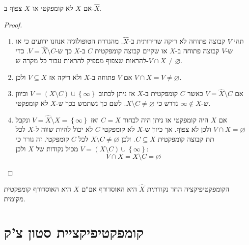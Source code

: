 \documentclass{tstextbook}
\begin{document}
\begin{proposition}
אם \(X\) לא קומפקטי אז \(X\) צפוף ב-\(\hat{X}\).

\end{proposition}
\begin{proof}
  \begin{enumerate}
    \item תהי \(V\) קבוצה פתוחה לא ריקה שרירותית ב-\(\hat{X}\). מהגדרת הטופולוגיה אנחנו ידועים כי או ש-\(V\) קבוצה פתוחה ב-\(X\) או שקיים קבוצה קומפקטית \(C\) ב-\(X\) כך ש-\(V=\hat{X}\setminus C\). כדי להראות שצפוף מספיק להראות עבור כל מקרה ש-\(V\cap X\neq \varnothing\). 


    \item אם \(V\) פתוחה ב-\(X\) ולא ריקה אז \(V\subseteq X\) ולכן \(V\cap X=V\neq \varnothing\). 


    \item אם \(V=\hat{X} \setminus C\) כאשר \(C\) קומפקטית ב-\(X\) אז ניתן לכתוב \(V=\left( X\setminus C \right)\cup \left\{  \infty  \right\}\) וכיוון ש-\(\infty \not \in X\) נדרש כי \(X \setminus C \neq \varnothing\). לשם כך נשתמש בכך ש-\(X\) לא קומפקטי. 


    \item אם \(X\) היה קומפקטי אז ניתן היה לבחור \(C=X\) ואז \(V=\hat{X} \setminus X=\left\{  \infty  \right\}\) ונקבל \(V\cap X=\varnothing\) ולכן לא צפוף. אך כיוון ש-\(X\) לא קומפקטי \(C\) לא יכול להיות שווה ל-\(X\) לכל תת קבוצה קומפקטית \(C\subseteq X\). ולכן \(X\setminus C\neq \varnothing\) לכל \(C\) קומפקטי. זה גורר כי \(V=\left( X\setminus  C \right)\cup \left\{  \infty  \right\}\) מכיל נקודות של \(X\) ולכן: 
$$V\cap X= X \setminus  C=\varnothing $$


  \end{enumerate}
\end{proof}
הקומפקטיפיקציה החד נקודתית \(\hat{X}\) היא האוסדורף אם"ם \(X\) היא האוסדורף קומפקטית מקומית.

\section{קומפקטיפיקציית סטון צ'ק}
\end{document}
